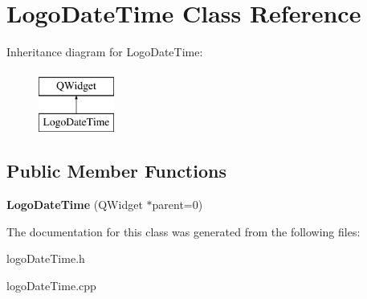 \hypertarget{class_logo_date_time}{}\section{Logo\+Date\+Time Class Reference}
\label{class_logo_date_time}
Inheritance diagram for Logo\+Date\+Time\+:\begin{figure}[H]
\begin{center}
\leavevmode
\includegraphics[height=2.000000cm]{class_logo_date_time}
\end{center}
\end{figure}
\subsection*{Public Member Functions}
\begin{DoxyCompactItemize}
\item 
\mbox{\label{class_logo_date_time_a26b46fb548f7457b7ba24906b3ed1648}} 
{\bfseries Logo\+Date\+Time} (Q\+Widget $\ast$parent=0)
\end{DoxyCompactItemize}


The documentation for this class was generated from the following files\+:\begin{DoxyCompactItemize}
\item 
logo\+Date\+Time.\+h\item 
logo\+Date\+Time.\+cpp\end{DoxyCompactItemize}
